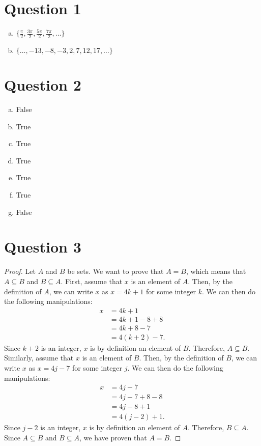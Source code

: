 \documentclass{article}
\begin{document}
\section*{Question 1}

\begin{enumerate}[(a)]
    \item $\{\frac{\pi}{2}, \frac{3 \pi}{2}, \frac{5 \pi}{2}, \frac{7 \pi}{2}, \ldots\}$
    \item $\{\ldots, -13, -8, -3, 2, 7, 12, 17, \ldots\}$
\end{enumerate}

\section*{Question 2}

\begin{enumerate}[(a)]
    \item False
    \item True
    \item True
    \item True
    \item True
    \item True
    \item False
\end{enumerate}

\section*{Question 3}
\begin{proof}
    Let $A$ and $B$ be sets.
    We want to prove that $A = B$, which means that $A \subseteq B$ and $B \subseteq A$.
    First, assume that $x$ is an element of $A$.
    Then, by the definition of $A$, we can write $x$ as $x = 4k + 1$ for some integer $k$.
    We can then do the following manipulations:
    \begin{align*}
        x &= 4k + 1 \\
        &= 4k + 1 - 8 + 8 \\
        &= 4k + 8 - 7 \\
        &= 4(k + 2) - 7.
    \end{align*}
    Since $k + 2$ is an integer, $x$ is by definition an element of $B$.
    Therefore, $A \subseteq B$.
    Similarly, assume that $x$ is an element of $B$.
    Then, by the definition of $B$, we can write $x$ as $x = 4j - 7$ for some integer $j$.
    We can then do the following manipulations:
    \begin{align*}
        x &= 4j - 7 \\
        &= 4j - 7 + 8 - 8 \\
        &= 4j - 8 + 1 \\
        &= 4(j - 2) + 1.
    \end{align*}
    Since $j - 2$ is an integer, $x$ is by definition an element of $A$.
    Therefore, $B \subseteq A$.
    Since $A \subseteq B$ and $B \subseteq A$, we have proven that $A = B$.
\end{proof}
\end{document}
